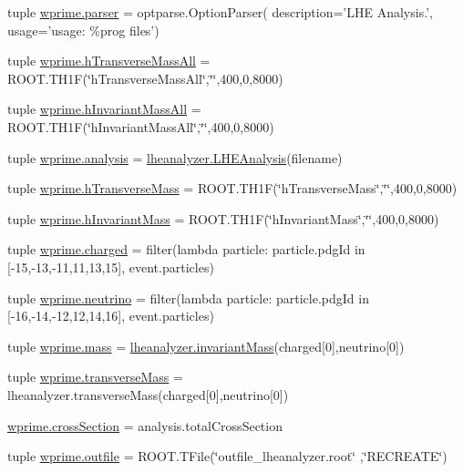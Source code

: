 \begin{DoxyCompactItemize}
\item 
tuple \hyperlink{namespacewprime_a63569f7a72dfda59eb510ce76651466c}{wprime.\-parser} = optparse.\-Option\-Parser( description='L\-H\-E Analysis.', usage='usage\-: \%prog files')
\item 
tuple \hyperlink{namespacewprime_ab19f1148d5fadc7f1b06601d37f3bd98}{wprime.\-h\-Transverse\-Mass\-All} = R\-O\-O\-T.\-T\-H1\-F(\char`\"{}h\-Transverse\-Mass\-All\char`\"{},\char`\"{}\char`\"{},400,0,8000)
\item 
tuple \hyperlink{namespacewprime_ad2dfae94ced65369bf5bcd8262a32357}{wprime.\-h\-Invariant\-Mass\-All} = R\-O\-O\-T.\-T\-H1\-F(\char`\"{}h\-Invariant\-Mass\-All\char`\"{},\char`\"{}\char`\"{},400,0,8000)
\item 
tuple \hyperlink{namespacewprime_aaa589daa7007d01a1a492b22539b19c6}{wprime.\-analysis} = \hyperlink{classlheanalyzer_1_1LHEAnalysis}{lheanalyzer.\-L\-H\-E\-Analysis}(filename)
\item 
tuple \hyperlink{namespacewprime_a7b192ad124dcdea0625bb9b0c55c6477}{wprime.\-h\-Transverse\-Mass} = R\-O\-O\-T.\-T\-H1\-F(\char`\"{}h\-Transverse\-Mass\char`\"{},\char`\"{}\char`\"{},400,0,8000)
\item 
tuple \hyperlink{namespacewprime_a27c3f5d5e385cb00150833fedb9001c0}{wprime.\-h\-Invariant\-Mass} = R\-O\-O\-T.\-T\-H1\-F(\char`\"{}h\-Invariant\-Mass\char`\"{},\char`\"{}\char`\"{},400,0,8000)
\item 
tuple \hyperlink{namespacewprime_af629c79a2061f7dcdee447ba6ebe2a7d}{wprime.\-charged} = filter(lambda particle\-: particle.\-pdg\-Id in \mbox{[}-\/15,-\/13,-\/11,11,13,15\mbox{]}, event.\-particles)
\item 
tuple \hyperlink{namespacewprime_aa30022404f607643027f776a815f22e8}{wprime.\-neutrino} = filter(lambda particle\-: particle.\-pdg\-Id in \mbox{[}-\/16,-\/14,-\/12,12,14,16\mbox{]}, event.\-particles)
\item 
tuple \hyperlink{namespacewprime_ad374268a3fa087dcdcb8aa73f71685b6}{wprime.\-mass} = \hyperlink{namespacelheanalyzer_ac56286ded5530897c81cc13b79edfd59}{lheanalyzer.\-invariant\-Mass}(charged\mbox{[}0\mbox{]},neutrino\mbox{[}0\mbox{]})
\item 
tuple \hyperlink{namespacewprime_ab689ae92a992d53349486936abb75b2e}{wprime.\-transverse\-Mass} = lheanalyzer.\-transverse\-Mass(charged\mbox{[}0\mbox{]},neutrino\mbox{[}0\mbox{]})
\item 
\hyperlink{namespacewprime_a8b4da92d3cc1e5113fa358ebbda61083}{wprime.\-cross\-Section} = analysis.\-total\-Cross\-Section
\item 
tuple \hyperlink{namespacewprime_abc2eda51ac0db27e451c75e1841c7c68}{wprime.\-outfile} = R\-O\-O\-T.\-T\-File(\char`\"{}outfile\-\_\-lheanalyzer.\-root\char`\"{} ,\char`\"{}R\-E\-C\-R\-E\-A\-T\-E\char`\"{})
\end{DoxyCompactItemize}

